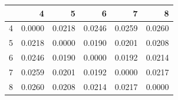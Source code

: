 \begin{tabular}{lrrrrr}
\toprule
 & 4 & 5 & 6 & 7 & 8 \\
\midrule
4 & 0.0000 & 0.0218 & 0.0246 & 0.0259 & 0.0260 \\
5 & 0.0218 & 0.0000 & 0.0190 & 0.0201 & 0.0208 \\
6 & 0.0246 & 0.0190 & 0.0000 & 0.0192 & 0.0214 \\
7 & 0.0259 & 0.0201 & 0.0192 & 0.0000 & 0.0217 \\
8 & 0.0260 & 0.0208 & 0.0214 & 0.0217 & 0.0000 \\
\bottomrule
\end{tabular}
